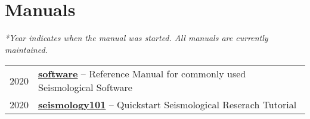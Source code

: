 \section*{Manuals}

\textit{*Year indicates when the manual was started. All manuals are currently maintained.}

\begin{tabular}{p{} p{}}
2020 &	\textbf{\href{https://seismo-learn.org/software/}{software}} -- Reference Manual for commonly used Seismological Software \\
2020 &	\textbf{\href{https://seismo-learn.org/seismology101/}{seismology101}} -- Quickstart Seismological Reserach Tutorial \\
\end{tabular}

